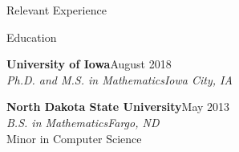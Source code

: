 \documentclass{resume} %
\begin{document}
\begin{rSection}{Relevant Experience}




\end{rSection}


\begin{rSection}{Education}

{\bf University of Iowa}\hfill August 2018\\
{\em Ph.D. and M.S. in Mathematics}\hfill {\em Iowa City, IA}%

{\bf North Dakota State University}\hfill May 2013\\
{\em B.S. in Mathematics}\hfill {\em Fargo, ND}\\
Minor in Computer Science


\end{rSection}









\end{document}

